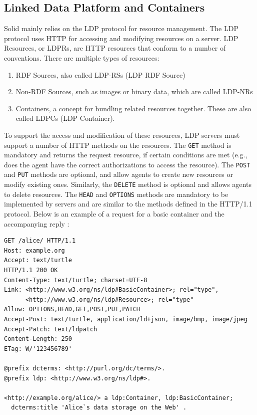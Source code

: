 \subsection{Linked Data Platform and Containers}
\label{subsec:ldp}
Solid mainly relies on the \gls{LDP} protocol \citep{ldp} for resource management. The \gls{LDP} protocol uses HTTP for accessing and modifying resources on a server. LDP Resources, or LDPRs, are HTTP resources that conform to a number of conventions. There are multiple types of resources:
\begin{enumerate}
    \item \gls{RDF} Sources, also called LDP-RSs (LDP \gls{RDF} Source)
    \item Non-\gls{RDF} Sources, such as images or binary data, which are called LDP-NRs
    \item Containers, a concept for bundling related resources together. These are also called LDPCs (LDP Container). 
\end{enumerate}

\noindent To support the access and modification of these resources, \gls{LDP} servers must support a number of HTTP methods on the resources. The \texttt{GET} method is mandatory and returns the request resource, if certain conditions are met (e.g., does the agent have the correct authorizations to access the resource). The \texttt{POST} and \texttt{PUT} methods are optional, and allow agents to create new resources or modify existing ones. Similarly, the \texttt{DELETE} method is optional and allows agents to delete resources. The \texttt{HEAD} and \texttt{OPTIONS} methods are mandatory to be implemented by servers and are similar to the methods defined in the HTTP/1.1 protocol. Below is an example of a request for a basic container and the accompanying reply \citep[from][]{ldp-primer}:

\begin{verbatim}
GET /alice/ HTTP/1.1
Host: example.org
Accept: text/turtle
HTTP/1.1 200 OK 
Content-Type: text/turtle; charset=UTF-8
Link: <http://www.w3.org/ns/ldp#BasicContainer>; rel="type", 
      <http://www.w3.org/ns/ldp#Resource>; rel="type"
Allow: OPTIONS,HEAD,GET,POST,PUT,PATCH
Accept-Post: text/turtle, application/ld+json, image/bmp, image/jpeg
Accept-Patch: text/ldpatch
Content-Length: 250
ETag: W/'123456789'
	
@prefix dcterms: <http://purl.org/dc/terms/>.
@prefix ldp: <http://www.w3.org/ns/ldp#>.
	
<http://example.org/alice/> a ldp:Container, ldp:BasicContainer;
  dcterms:title 'Alice`s data storage on the Web' .	
\end{verbatim}

